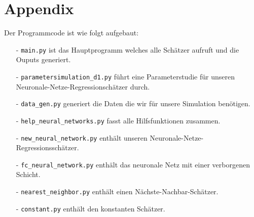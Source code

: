 \chapter*{Appendix}
\label{chap:app}

Der Programmcode ist wie folgt aufgebaut:
\begin{itemize}
    \item[-] \texttt{main.py} ist das Hauptprogramm welches alle Schätzer aufruft und die Ouputs generiert.
    \item[-] \texttt{parametersimulation\_d1.py} führt eine Parameterstudie für unseren Neuronale-Netze-Regressionschätzer durch.
    \item[-] \texttt{data\_gen.py} generiert die Daten die wir für unsere Simulation benötigen.
    \item[-] \texttt{help\_neural\_networks.py} fasst alle Hilfsfunktionen zusammen.
    \item[-] \texttt{new\_neural\_network.py} enthält unseren Neuronale-Netze-Regressionsschätzer.
    \item[-] \texttt{fc\_neural\_network.py} enthält das neuronale Netz mit einer verborgenen Schicht.
    \item[-] \texttt{nearest\_neighbor.py} enthält einen Nächste-Nachbar-Schätzer.
    \item[-] \texttt{constant.py} enthält den konstanten Schätzer.
\end{itemize}
\renewcommand\lstlistingname{Listing}







